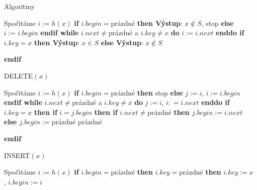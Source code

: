 \documentclass[a4paper,12pt]{article}
\begin{document}
\subhead
Algoritmy
\endsubhead
\smallskip

\newline 
Spo\v c\'\i t\'ame $i:=h(x)$\newline 
{\bf if} $i.begin=$pr\'azdn\'e {\bf then V\'ystup}: $x\notin S$, stop {\bf else} $i:=i.begin$ {\bf endif\newline 
while} $i.next\ne$pr\'azdn\'e a $i.key\ne x$ {\bf do} $i:=i.next$ {\bf enddo \newline 
if} $i.key=x$ {\bf then V\'ystup}: $x\in S$ {\bf else V\'ystup}: $
x\notin S$ {\bf endif
\bigskip

\flushpar DELETE$(x)$}\newline 
Spo\v c\'\i t\'ame $i:=h(x)$\newline 
{\bf if} $i.begin=$pr\'azdn\'e {\bf then} stop {\bf else} $j:=i$, $
i:=i.begin$ {\bf endif\newline 
while} $i.next\ne$pr\'azdn\'e a $i.key\ne x$ {\bf do} $j:=i$, $i:
=i.next$ {\bf enddo \newline 
if} $i.key=x$ {\bf then\newline 
\phantom{{\rm ---}}if} $i=j.begin$ {\bf then\newline 
\phantom{{\rm ------}}if} $i.next\ne$pr\'azdn\'e {\bf then\newline 
\phantom{{\rm ---------}}$j.begin:=i.next$\newline 
\phantom{{\rm ------}}else\newline 
\phantom{{\rm ---------}}$j.begin:=$}pr\'azdn\'e\newline 
{}pr\'azdn\'e\newline 
{\bf endif
\bigskip

\flushpar INSERT$(x)$}\newline 
Spo\v c\'\i t\'ame $i:=h(x)$\newline 
{\bf if} $i.begin=$pr\'azdn\'e {\bf then}\newline 
\phantom{---}{\bf if} $i.key=$pr\'azdn\'e {\bf then}\newline 
\phantom{------}$i.key:=x$, $i.begin:=i$\newline 
\phantom{---}{\bf else}\newline 
\end{document}
